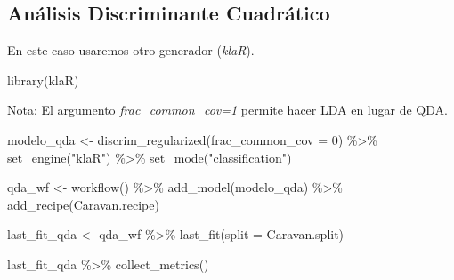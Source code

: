 \documentclass[
  12pt,
]{book}
\newenvironment{Shaded}{\begin{snugshade}}{\end{snugshade}}
\newcommand{\AttributeTok}[1]{\textcolor[rgb]{0.77,0.63,0.00}{#1}}
\newcommand{\DecValTok}[1]{\textcolor[rgb]{0.00,0.00,0.81}{#1}}
\newcommand{\FunctionTok}[1]{\textcolor[rgb]{0.00,0.00,0.00}{#1}}
\newcommand{\NormalTok}[1]{#1}
\newcommand{\OtherTok}[1]{\textcolor[rgb]{0.56,0.35,0.01}{#1}}
\newcommand{\SpecialCharTok}[1]{\textcolor[rgb]{0.00,0.00,0.00}{#1}}
\newcommand{\StringTok}[1]{\textcolor[rgb]{0.31,0.60,0.02}{#1}}
\theoremstyle{definition}
\theoremstyle{definition}
\theoremstyle{definition}
\theoremstyle{definition}
\theoremstyle{remark}
\begin{document}
\hypertarget{anuxe1lisis-discriminante-cuadruxe1tico-1}{%
\subsection{Análisis Discriminante Cuadrático}\label{anuxe1lisis-discriminante-cuadruxe1tico-1}}

En este caso usaremos otro generador (\emph{klaR}).

\begin{Shaded}
\begin{Highlighting}[]
\FunctionTok{library}\NormalTok{(klaR)}
\end{Highlighting}
\end{Shaded}

Nota: El argumento \emph{frac\_common\_cov=1} permite hacer LDA en lugar de QDA.

\begin{Shaded}
\begin{Highlighting}[]
\NormalTok{modelo\_qda }\OtherTok{\textless{}{-}} \FunctionTok{discrim\_regularized}\NormalTok{(}\AttributeTok{frac\_common\_cov =} \DecValTok{0}\NormalTok{) }\SpecialCharTok{\%\textgreater{}\%}
    \FunctionTok{set\_engine}\NormalTok{(}\StringTok{"klaR"}\NormalTok{) }\SpecialCharTok{\%\textgreater{}\%}
    \FunctionTok{set\_mode}\NormalTok{(}\StringTok{"classification"}\NormalTok{)}
\end{Highlighting}
\end{Shaded}

\begin{Shaded}
\begin{Highlighting}[]
\NormalTok{qda\_wf }\OtherTok{\textless{}{-}} \FunctionTok{workflow}\NormalTok{() }\SpecialCharTok{\%\textgreater{}\%}
    \FunctionTok{add\_model}\NormalTok{(modelo\_qda) }\SpecialCharTok{\%\textgreater{}\%}
    \FunctionTok{add\_recipe}\NormalTok{(Caravan.recipe)}

\NormalTok{last\_fit\_qda }\OtherTok{\textless{}{-}}\NormalTok{ qda\_wf }\SpecialCharTok{\%\textgreater{}\%}
    \FunctionTok{last\_fit}\NormalTok{(}\AttributeTok{split =}\NormalTok{ Caravan.split)}
\end{Highlighting}
\end{Shaded}

\begin{Shaded}
\begin{Highlighting}[]
\NormalTok{last\_fit\_qda }\SpecialCharTok{\%\textgreater{}\%}
    \FunctionTok{collect\_metrics}\NormalTok{()}
\end{Highlighting}
\end{Shaded}
\end{document}
